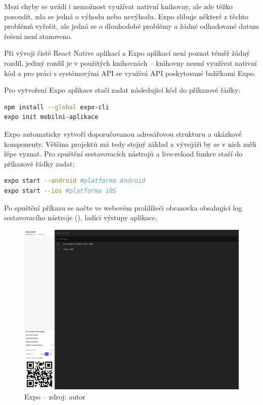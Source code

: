 Mezi chyby se uvádí i nemožnost využívat nativní knihovny, ale zde těžko posoudit, zda se jedná o výhodu nebo nevýhodu. Expo slibuje některé z těchto problémů vyřešit, ale jedná se o dlouhodobé problémy a žádné odhadované datum řešení není stanoveno. 

Při vývoji čistě React Native aplikací a Expo aplikací není poznat téměř žádný rozdíl, jediný rozdíl je v použitých knihovnách -- knihovny nesmí využívat nativní kód a pro práci s systémovými API se využívá API poskytované balíčkami Expo.

Pro vytvoření Expo aplikace stačí zadat následující kód do příkazové řádky:

\begin{lstlisting}[language=Bash, caption=Vytvoření základní struktury aplikace]
npm install --global expo-cli
expo init mobilni-aplikace
\end{lstlisting}

Expo automaticky vytvoří doporučovanou adresářovou strukturu a ukázkové komponenty. Většina projektů má tedy stejný základ a vývojáři by se v nich měli lépe vyznat. Pro spuštění sestavovacích nástrojů a live-reload funkce stačí do příkazové řádky zadat:

\begin{lstlisting}[language=Bash, caption=Spuštění mobilní aplikace na virtuálním stroji nebo připojeném zařízení]
expo start --android #platforma Android
expo start --ios #platforma iOS
\end{lstlisting}

Po spuštění příkazu se načte ve webovém prohlížeči obrazovka obsahující log sestavovacího nástroje (), ladící výstupy aplikace, 

\begin{figure}
	\begin{center}
		\includegraphics[width=140mm]{img/expo.png}
	\end{center}
	\caption{Expo -- zdroj: autor}
\end{figure}



